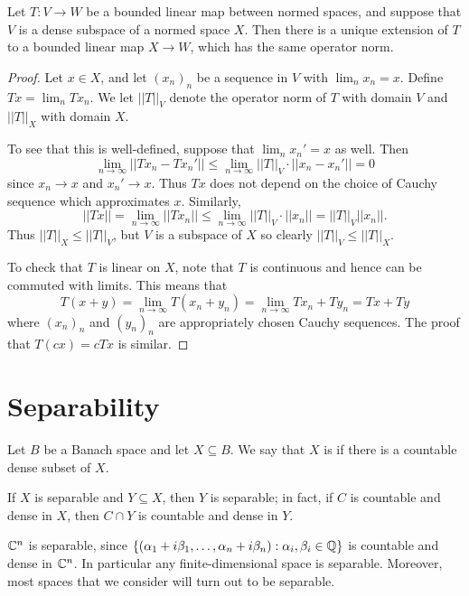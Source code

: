 \begin{lemma}\label{linear extension}
Let $T: V \to W$ be a bounded linear map between normed spaces, and suppose that $V$ is a dense subspace of a normed space $X$.
Then there is a unique extension of $T$ to a bounded linear map $X \to W$, which has the same operator norm.
\end{lemma}
\begin{proof}
Let $x \in X$, and let ${(x_{n})}_{n}$ be a sequence in $V$ with $\lim_{n} x_{n} = x$.
Define $Tx = \lim_{n} Tx_{n}$.
We let $||T||_{V}$ denote the operator norm of $T$ with domain $V$ and $||T||_{X}$ with domain $X$.

To see that this is well-defined, suppose that $\lim_{n} x_{n}' = x$ as well. Then
\[\lim_{n \to \infty} ||Tx_{n} - Tx_{n}'|| \leq \lim_{n \to \infty} ||T||_{V} \cdot||x_{n} - x_{n}'|| = 0\]
since $x_{n} \to x$ and $x_{n}' \to x$.
Thus $Tx$ does not depend on the choice of Cauchy sequence which approximates $x$.
Similarly,
\[||Tx|| = \lim_{n \to \infty} ||Tx_{n}|| \leq \lim_{n \to \infty} ||T||_{V} \cdot||x_{n}|| = ||T||_{V} ||x_{n}||.\]
Thus $||T||_{X} \leq ||T||_{V}$, but $V$ is a subspace of $X$ so clearly $||T||_{V} \leq ||T||_{X}$.

To check that $T$ is linear on $X$, note that $T$ is continuous and hence can be commuted with limits. This means that
\[T(x + y) = \lim_{n \to \infty} T(x_{n} + y_{n}) = \lim_{n \to \infty} Tx_{n} + Ty_{n} = Tx + Ty\]
where ${(x_{n})}_{n}$ and ${(y_{n})}_{n}$ are appropriately chosen Cauchy sequences.
The proof that $T(cx) = cTx$ is similar.
\end{proof}

\section{Separability}
\begin{definition}
Let $B$ be a Banach space and let $X \subseteq B$. We say that $X$ is  if there is a countable dense subset of $X$.
\end{definition}

\begin{subsec}
If $X$ is separable and $Y \subseteq X$, then $Y$ is separable; in fact, if $C$ is countable and dense in $X$, then $C \cap Y$ is countable and dense in $Y$.
\end{subsec}

\begin{example}
$\mathbb{C}^{n}$ is separable, since $\{(\alpha_{1} + i\beta_{1}, \dots, \alpha_{n} + i \beta_{n}): \alpha_{i}, \beta_{i} \in \mathbb{Q}\}$ is countable and dense in $\mathbb{C}^{n}$.
In particular any finite-dimensional space is separable. Moreover, most spaces that we consider will turn out to be separable.
\end{example}

